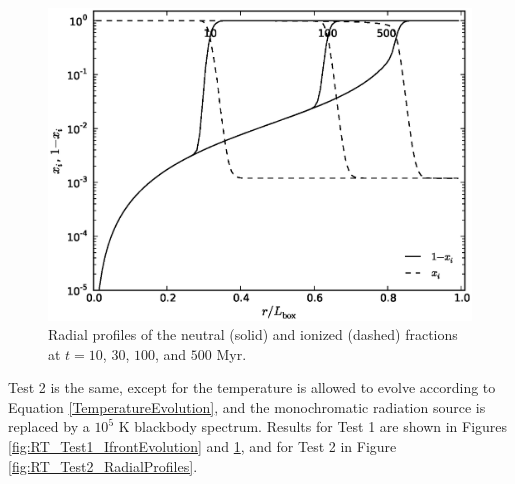 \documentclass[preprint2]{aastex}              %
\begin{document}
\begin{figure}[htbp]
\begin{center}
\includegraphics[scale=0.4]{figures/RT_Test1_RadialProfiles.ps}
\vspace{-20pt}
\caption[]{Radial profiles of the neutral (solid) and ionized (dashed) fractions at $t = 10$, $30$, $100$, and $500$ Myr.}
\label{fig:RT_Test1_RadialProfiles}
\end{center}
\end{figure}

Test 2 is the same, except for the temperature is allowed to evolve according to Equation \ref{TemperatureEvolution}, and the monochromatic radiation source is replaced by a $10^5$ K blackbody spectrum.  Results for Test 1 are shown in Figures \ref{fig:RT_Test1_IfrontEvolution} and \ref{fig:RT_Test1_RadialProfiles}, and for Test 2 in Figure \ref{fig:RT_Test2_RadialProfiles}.
\end{document}
